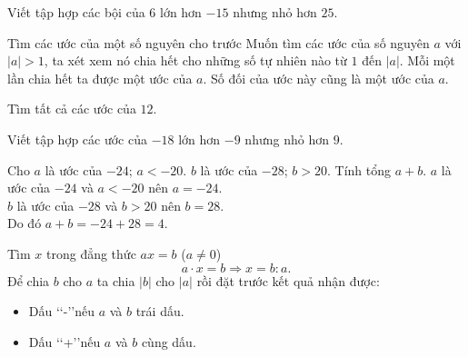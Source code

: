 \begin{vd}%
Viết tập hợp các bội của $ 6 $ lớn hơn $ -15 $ nhưng nhỏ hơn $ 25 $.
\end{vd}




\begin{dang}{Tìm các ước của một số nguyên cho trước}
Muốn tìm các ước của số nguyên $ a $ với $ |a|>1 $, ta xét xem nó chia hết cho những số tự nhiên nào từ $ 1 $ đến $ |a| $. Mỗi một lần chia hết ta được một ước của $ a $. Số đối của ước này cũng là một ước của $ a $.
\end{dang}

\begin{vd}%
Tìm tất cả các ước của $ 12 $.
\end{vd}

\begin{vd}%
	Viết tập hợp các ước của $ -18 $ lớn hơn $ -9 $ nhưng nhỏ hơn $ 9 $.
\end{vd}

\begin{vd}%
Cho $ a $ là ước của $ -24 $; $ a<-20 $. $ b $ là ước của $ -28 $; $ b>20 $. Tính tổng $ a+b $.
	\loigiai
	{
$ a $ là ước của $ -24 $ và $ a<-20 $ nên $ a=-24 $.\\
$ b $ là ước của $ -28 $ và  $ b>20 $	nên $ b=28 $.\\
Do đó $ a+b=-24+28=4 $.	
	}
\end{vd}



\begin{dang}{Tìm $ x $ trong đẳng thức $ ax=b $ ($ a \ne 0 $)}
\[a \cdot x=b \Rightarrow x=b:a.\]
Để chia $ b $ cho $ a $ ta chia $ |b| $ cho $ |a| $ rồi đặt trước kết quả nhận được:
\begin{itemize}
	\item Dấu \lq\lq -\rq\rq nếu $ a $ và $ b $ trái dấu.
	\item Dấu \lq\lq +\rq\rq nếu $ a $ và $ b $ cùng dấu.
\end{itemize}
\end{dang}

